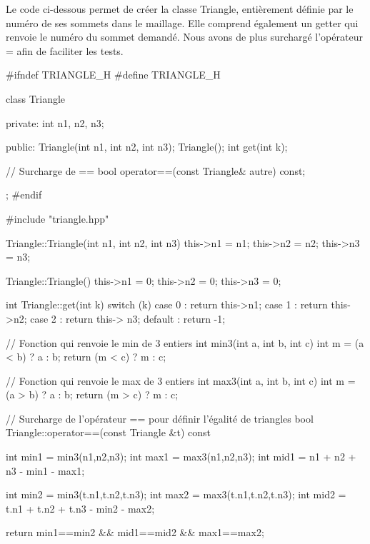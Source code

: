 \label{sec:triangle}
Le code ci-dessous permet de créer la classe Triangle, entièrement définie par le numéro de ses sommets dans le maillage. Elle comprend également un getter qui renvoie le numéro du sommet demandé. Nous avons de plus surchargé l'opérateur = afin de faciliter les tests.
\vspace{0.8em}


\begin{codeblock}
#ifndef TRIANGLE_H
#define TRIANGLE_H

class Triangle {

private:
    int n1, n2, n3;

public:
    Triangle(int n1, int n2, int n3);
    Triangle();
    int get(int k);

    // Surcharge de ==
    bool operator==(const Triangle& autre) const;
};
#endif
\end{codeblock}

\begin{codeblock}
#include "triangle.hpp"


Triangle::Triangle(int n1, int n2, int n3){
    this->n1 = n1;
    this->n2 = n2;
    this->n3 = n3;
}


Triangle::Triangle(){
    this->n1 = 0;
    this->n2 = 0;
    this->n3 = 0;
}


int Triangle::get(int k){
    switch (k){
        case 0 : return this->n1;
        case 1 : return this->n2;
        case 2 : return this-> n3;
        default : return -1;
    }
}

// Fonction qui renvoie le min de 3 entiers
int min3(int a, int b, int c) {
    int m = (a < b) ? a : b;
    return (m < c) ? m : c;
}


// Fonction qui renvoie le max de 3 entiers
int max3(int a, int b, int c) {
    int m = (a > b) ? a : b;
    return (m > c) ? m : c;
}


// Surcharge de l'opérateur == pour définir l'égalité de triangles
bool Triangle::operator==(const Triangle &t) const {
    int min1 = min3(n1,n2,n3);
    int max1 = max3(n1,n2,n3);
    int mid1 = n1 + n2 + n3 - min1 - max1;

    int min2 = min3(t.n1,t.n2,t.n3);
    int max2 = max3(t.n1,t.n2,t.n3);
    int mid2 = t.n1 + t.n2 + t.n3 - min2 - max2;

    return min1==min2 && mid1==mid2 && max1==max2;
}
\end{codeblock}